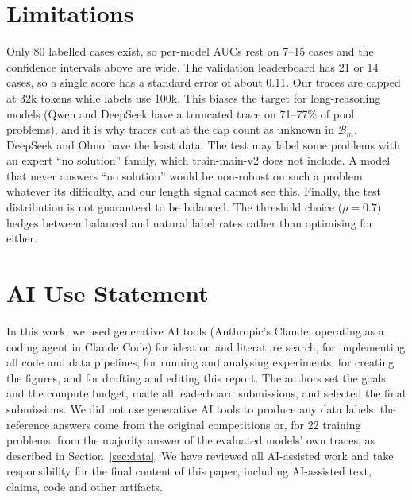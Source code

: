 \documentclass{article}
\begin{document}
\section*{Limitations}
Only 80 labelled cases exist, so per-model AUCs rest on 7--15 cases and the confidence intervals above are wide.
The validation leaderboard has 21 or 14 cases, so a single score has a standard error of about 0.11.
Our traces are capped at 32k tokens while labels use 100k. This biases the target for long-reasoning models (Qwen and DeepSeek have a truncated trace on 71--77\% of pool problems), and it is why traces cut at the cap count as unknown in $\mathcal{B}_m$.
DeepSeek and Olmo have the least data.
The test may label some problems with an expert ``no solution'' family, which train-main-v2 does not include. A model that never answers ``no solution'' would be non-robust on such a problem whatever its difficulty, and our length signal cannot see this.
Finally, the test distribution is not guaranteed to be balanced. The threshold choice ($\rho = 0.7$) hedges between balanced and natural label rates rather than optimising for either.

\section*{AI Use Statement}
In this work, we used generative AI tools (Anthropic's Claude, operating as a coding agent in Claude Code) for ideation and literature search, for implementing all code and data pipelines, for running and analysing experiments, for creating the figures, and for drafting and editing this report.
The authors set the goals and the compute budget, made all leaderboard submissions, and selected the final submissions.
We did not use generative AI tools to produce any data labels: the reference answers come from the original competitions or, for 22 training problems, from the majority answer of the evaluated models' own traces, as described in Section~\ref{sec:data}.
We have reviewed all AI-assisted work and take responsibility for the final content of this paper, including AI-assisted text, claims, code and other artifacts.




\appendix
\end{document}
